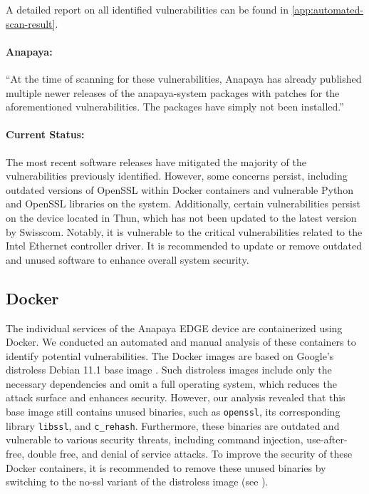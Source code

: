 A detailed report on all identified vulnerabilities can be found in \cref{app:automated-scan-result}.

\begin{boxH}
\paragraph{Anapaya:}
``At the time of scanning for these vulnerabilities, Anapaya has already published multiple newer releases of the anapaya-system packages with patches for the aforementioned vulnerabilities. The packages have simply not been installed.''
\end{boxH}

\paragraph{Current Status:}
The most recent software releases have mitigated the majority of the vulnerabilities previously identified.
However, some concerns persist, including outdated versions of OpenSSL within Docker containers and vulnerable Python and OpenSSL libraries on the system.
Additionally, certain vulnerabilities persist on the device located in Thun, which has not been updated to the latest version by Swisscom.
Notably, it is vulnerable to the critical vulnerabilities related to the Intel Ethernet controller driver.
It is recommended to update or remove outdated and unused software to enhance overall system security.

\subsection{Docker}
\label{sec:docker}

The individual services of the Anapaya EDGE device are containerized using Docker.
We conducted an automated and manual analysis of these containers to identify potential vulnerabilities.
The Docker images are based on Google's distroless Debian 11.1 base image \cite{githubGitHubGoogleContainerToolsdistroless}.
Such distroless images include only the necessary dependencies and omit a full operating system, which reduces the attack surface and enhances security.
However, our analysis revealed that this base image still contains unused binaries, such as \texttt{openssl}, its corresponding library \texttt{libssl}, and \texttt{c\_rehash}.
Furthermore, these binaries are outdated and vulnerable to various security threats, including command injection, use-after-free, double free, and denial of service attacks.
To improve the security of these Docker containers, it is recommended to remove these unused binaries by switching to the no-ssl variant of the distroless image (see \cite{githubGitHubGoogleContainerToolsdistroless}).

